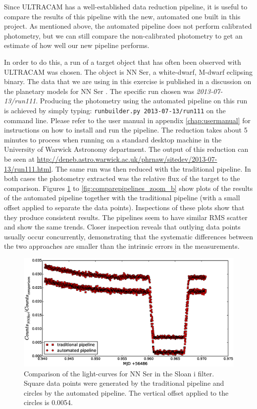 Since ULTRACAM has a well-established data reduction pipeline, it is useful to compare the results of this pipeline with the new, automated one built in this project. As mentioned above, the automated pipeline does not perform calibrated photometry, but we can still compare the non-calibrated photometry to get an estimate of how well our new pipeline performs.

In order to do this, a run of a target object that has often been observed with ULTRACAM was chosen. The object is NN Ser, a white-dwarf, M-dwarf eclipsing binary. The data that we are using in this exercise is published in a discussion on the planetary models for NN Ser \citep{NNSer2014}. The specific run chosen was \emph{2013-07-13/run111}. Producing the photometry using the automated pipeline on this run is achieved by simply typing: \texttt{runbuilder.py 2013-07-13/run111} on the command line. Please refer to the user manual in appendix \ref{chap:usermanual} for instructions on how to install and run the pipeline.  The reduction takes about 5 minutes to process when running on a standard desktop machine in the University of Warwick Astronomy department. The output of this reduction can be seen at \url{http://deneb.astro.warwick.ac.uk/phrnaw/sitedev/2013-07-13/run111.html}. The same run was then reduced with the traditional pipeline. In both cases the photometry extracted was the relative flux of the target to the comparison. Figures \ref{fig:comparepipelines_r} to \ref{fig:comparepipelines_zoom_b} show plots of the results of the automated pipeline together with the traditional pipeline (with a small offset applied to separate the data points). Inspections of these plots show that they produce consistent results. The pipelines seem to have similar RMS scatter and show the same trends. Closer inspection reveals that outlying data points usually occur concurrently,  demonstrating that the systematic differences between the two approaches are smaller than the intrinsic errors in the measurements. 

\begin{figure}
\centering
\includegraphics[width=140mm]{images/nn_ser_compare_r.eps}
\caption{Comparison of the light-curves for NN Ser in the Sloan i filter. Square data points were generated by the traditional pipeline and circles by the automated pipeline. The vertical offset applied to the circles is 0.0054. }
\label{fig:comparepipelines_r}
\end{figure}

